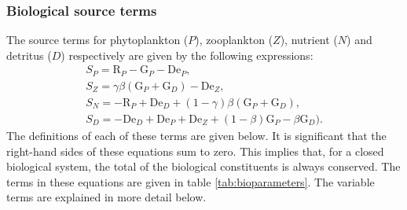\subsubsection{Biological source terms}
The source terms for phytoplankton ($P$), zooplankton ($Z$), nutrient ($N$)
and detritus ($D$) respectively are given by the following expressions:
\begin{gather}
  S_P=\mathrm{R}_P -  \mathrm{G}_P -\mathrm{De}_P,\\
  S_Z=\gamma\beta(\mathrm{G}_P+\mathrm{G}_D) - \mathrm{De}_Z,\\
  S_N=-\mathrm{R}_P + \mathrm{De}_D +
  (1-\gamma)\beta(\mathrm{G}_P+\mathrm{G}_D),\\
  S_D=-\mathrm{De}_D + \mathrm{De}_P + \mathrm{De}_Z + (1-\beta)\mathrm{G}_P
  -\beta\mathrm{G}_D).
\end{gather}
The definitions of each of these terms are given below. It is significant
that the right-hand sides of these equations sum to zero. This implies that,
for a closed biological system, the total of the biological constituents is
always conserved. The terms in these equations are given in table
\ref{tab:bioparameters}. The variable terms are explained in more detail below.

